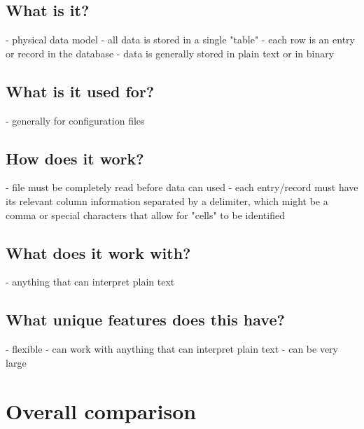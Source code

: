 \section{What is it?}
- physical data model
- all data is stored in a single "table"
- each row is an entry or record in the database
- data is generally stored in plain text or in binary

\section{What is it used for?}
- generally for configuration files

\section{How does it work?}
- file must be completely read before data can used
- each entry/record must have its relevant column information separated by a delimiter, which might be a comma or special characters that allow for "cells" to be identified

\section{What does it work with?}
- anything that can interpret plain text

\section{What unique features does this have?}
- flexible - can work with anything that can interpret plain text
- can be very large

\chapter{Overall comparison}


